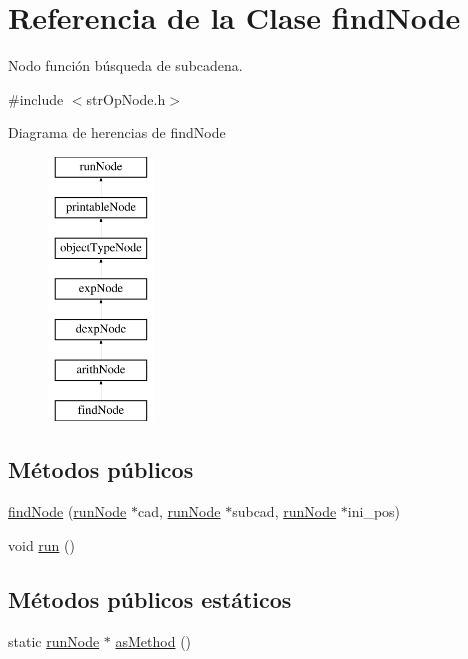 \hypertarget{classfindNode}{\section{Referencia de la Clase find\-Node}
\label{classfindNode}
}


Nodo función búsqueda de subcadena.  




{\ttfamily \#include $<$str\-Op\-Node.\-h$>$}

Diagrama de herencias de find\-Node\begin{figure}[H]
\begin{center}
\leavevmode
\includegraphics[height=7.000000cm]{classfindNode}
\end{center}
\end{figure}
\subsection*{Métodos públicos}
\begin{DoxyCompactItemize}
\item 
\hyperlink{classfindNode_ac09b97ca401c04472c4da0fd277bdcc9}{find\-Node} (\hyperlink{classrunNode}{run\-Node} $\ast$cad, \hyperlink{classrunNode}{run\-Node} $\ast$subcad, \hyperlink{classrunNode}{run\-Node} $\ast$ini\-\_\-pos)
\item 
void \hyperlink{classfindNode_a50ac36a34f93eb0facbd1b3c240bffc6}{run} ()
\end{DoxyCompactItemize}
\subsection*{Métodos públicos estáticos}
\begin{DoxyCompactItemize}
\item 
static \hyperlink{classrunNode}{run\-Node} $\ast$ \hyperlink{classfindNode_a6d65e85c3ee20fa14e240932dab11aa6}{as\-Method} ()
\end{DoxyCompactItemize}
